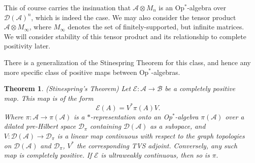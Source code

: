 \documentclass[12pt]{article}
\newtheorem*{theorem}{Theorem}
\newcommand\mc{\mathcal}
\newcommand\ms{\mathscr}
\begin{document}
This of course carries the insinuation that $\ms{A} \otimes M_n$ is an Op$^*$-algebra over $\mc{D}(\ms{A})^n$, which is indeed
the case.
We may also consider the tensor product $\ms{A} \otimes M_\infty$, where $M_\infty$ denotes the set of finitely-supported,
but infinite matrices. We will consider stability of this tensor product and its relationship to complete positivity later.

There is a generalization of the Stinespring Theorem for this class, and hence any more specific class of positive maps between
Op$^*$-algebras.

\begin{theorem}

	(Stinespring's Theorem) Let $\mc{E}: \ms{A} \to \ms{B}$ be a completely positive map. This map is of the form
	\[\mc{E}(A) = V^*\pi(A)V.\] Where $\pi: \ms{A} \to \pi(\ms{A})$ is a $*$-representation onto an Op$^*$-algebra 
	$\pi(\ms{A})$ over a dilated pre-Hilbert space $\mc{D}_\pi$ containing $\mc{D}(\mc{A})$ as a subspace, and 
	$V:\mc{D}(\ms{A}) \to \mc{D}_\pi$ is a linear map continuous with respect to the graph topologies on $\mc{D}(\ms{A})$
	and $\mc{D}_\pi$, $V^*$ the corresponding TVS adjoint. Conversely, any such map is completely positive. If $\mc{E}$ is 
	ultraweakly continuous, then so is $\pi$.

\end{theorem}
\end{document}
